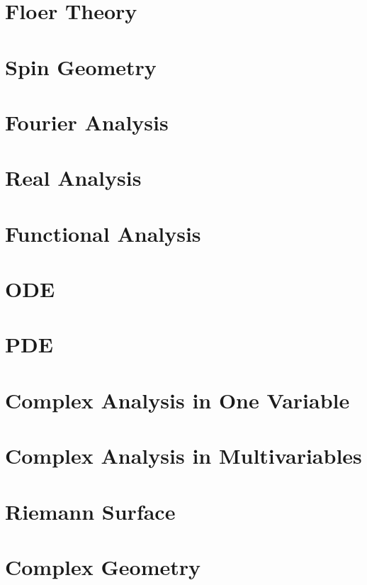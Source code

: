 \documentclass{ModulEN}
\begin{document}
	\part{Floer Theory}
	
	\part{Spin Geometry}
	
	\part{Fourier Analysis}
	
	\part{Real Analysis}
	
	\part{Functional Analysis}
	
	\part{ODE}
	
	\part{PDE}
	
	\part{Complex Analysis in One Variable}
	
	\part{Complex Analysis in Multivariables}
		
	
	\part{Riemann Surface}
	
		\label{Riemann-Surface}
	
	\part{Complex Geometry}
	
\end{document}
